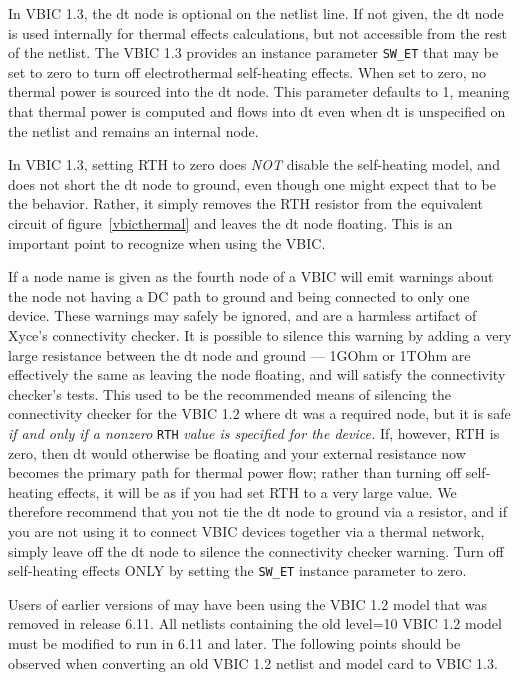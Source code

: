 In VBIC 1.3, the dt node is optional on the netlist line.  If not
given, the dt node is used internally for thermal effects
calculations, but not accessible from the rest of the netlist.  The
VBIC 1.3 provides an instance parameter \texttt{SW\_ET} that may be
set to zero to turn off electrothermal self-heating effects.  When set
to zero, no thermal power is sourced into the dt node.  This parameter
defaults to 1, meaning that thermal power is computed and flows into
dt even when dt is unspecified on the netlist and remains an internal
node.

In VBIC 1.3, setting RTH to zero does {\em NOT\/} disable the
self-heating model, and does not short the dt node to ground, even
though one might expect that to be the behavior.  Rather, it simply
removes the RTH resistor from the equivalent circuit of
figure~\ref{vbicthermal} and leaves the dt node floating.  This is an
important point to recognize when using the VBIC.

If a node name is given as the fourth node of a VBIC \Xyce{} will emit
warnings about the node not having a DC path to ground and being
connected to only one device.  These warnings may safely be ignored,
and are a harmless artifact of Xyce's connectivity checker.  It is
possible to silence this warning by adding a very large resistance
between the dt node and ground --- 1GOhm or 1TOhm are effectively the
same as leaving the node floating, and will satisfy the connectivity
checker's tests.  This used to be the recommended means of silencing
the connectivity checker for the VBIC 1.2 where dt was a required
node, but it is safe {\em if and only if a nonzero\/} \texttt{RTH}
{\em value is specified for the device.}  If, however, RTH is zero,
then dt would otherwise be floating and your external resistance now
becomes the primary path for thermal power flow; rather than turning
off self-heating effects, it will be as if you had set RTH to a very
large value.  We therefore recommend that you not tie the dt node to
ground via a resistor, and if you are not using it to connect VBIC
devices together via a thermal network, simply leave off the dt node
to silence the connectivity checker warning.  Turn off self-heating
effects ONLY by setting the \texttt{SW\_ET} instance parameter to zero.

Users of earlier versions of \Xyce{} may have been using the VBIC 1.2
model that was removed in release 6.11.  All netlists containing the
old level=10 VBIC 1.2 model must be modified to run in \Xyce{} 6.11
and later.  The following points should be observed when converting an
old VBIC 1.2 netlist and model card to VBIC 1.3.

